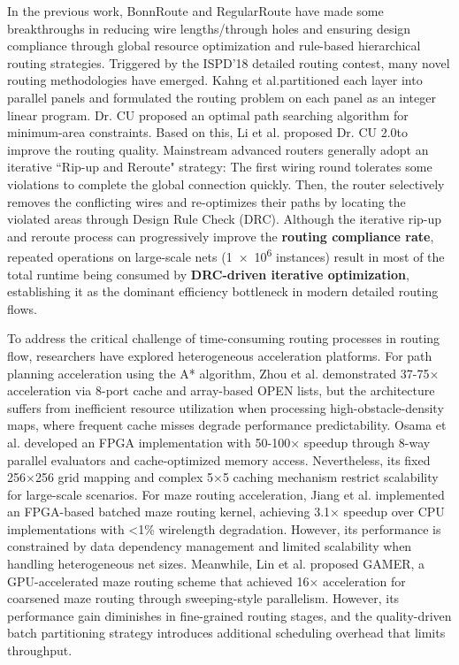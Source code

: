 In the previous work, BonnRoute\cite{Bo2013} and RegularRoute\cite{Re2013} have made some breakthroughs in reducing wire lengths/through holes and ensuring design compliance through global resource optimization and rule-based hierarchical routing strategies. 
Triggered by the ISPD'18 detailed routing contest\cite{IS2018}, many novel routing methodologies have emerged. Kahng et al.\cite{Tr2018}partitioned each layer into parallel panels and formulated the routing problem on each panel as an integer linear program. 
Dr. CU\cite{De2019} proposed an optimal path searching algorithm for minimum-area constraints. Based on this, Li et al. proposed Dr. CU 2.0\cite{Dr2019}to improve the routing quality. 
Mainstream advanced routers generally adopt an iterative ``Rip-up and Reroute" strategy: The first wiring round tolerates some violations to complete the global connection quickly. 
Then, the router selectively removes the conflicting wires and re-optimizes their paths by locating the violated areas through Design Rule Check (DRC). 
Although the iterative rip-up and reroute process can progressively improve the \textbf{routing compliance rate}, repeated operations on large-scale nets (\num{1e6} instances) result in most of the total runtime being consumed by \textbf{DRC-driven iterative optimization}, establishing it as the dominant efficiency bottleneck in modern detailed routing flows.

To address the critical challenge of time-consuming routing processes in routing flow, researchers have explored heterogeneous acceleration platforms. 
For path planning acceleration using the A* algorithm, Zhou et al.\cite{FP2020} demonstrated 37-75× acceleration via 8-port cache and array-based OPEN lists, 
but the architecture suffers from inefficient resource utilization when processing high-obstacle-density maps, where frequent cache misses degrade performance predictability. 
Osama et al.\cite{Fa2021} developed an FPGA implementation with 50-100× speedup through 8-way parallel evaluators and cache-optimized memory access. 
Nevertheless, its fixed 256×256 grid mapping and complex 5×5 caching mechanism restrict scalability for large-scale scenarios. 
For maze routing acceleration, Jiang et al.\cite{FP2022} implemented an FPGA-based batched maze routing kernel, achieving 3.1× speedup over CPU implementations with <1\% wirelength degradation. 
However, its performance is constrained by data dependency management and limited scalability when handling heterogeneous net sizes. 
Meanwhile, Lin et al.\cite{GA2023} proposed GAMER, a GPU-accelerated maze routing scheme that achieved 16× acceleration for coarsened maze routing through sweeping-style parallelism. 
However, its performance gain diminishes in fine-grained routing stages, and the quality-driven batch partitioning strategy introduces additional scheduling overhead that limits throughput.

